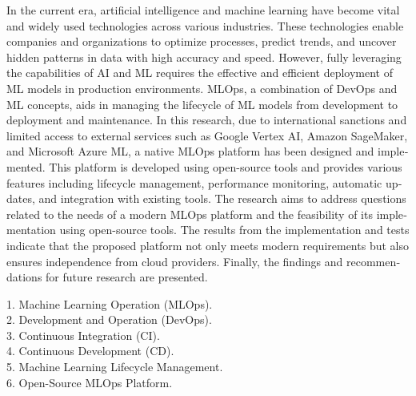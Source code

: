 \thispagestyle{empty}


\phantom{a}
\vfil

\begin{latin}
\centering
\begin{minipage}{0.9\textwidth}
{


\vskip 2mm

\baselineskip
In the current era, artificial intelligence and machine learning  have become vital and widely used technologies across various industries. These technologies enable companies and organizations to optimize processes, predict trends, and uncover hidden patterns in data with high accuracy and speed. However, fully leveraging the capabilities of AI and ML requires the effective and efficient deployment of ML models in production environments. MLOps, a combination of DevOps and ML concepts, aids in managing the lifecycle of ML models from development to deployment and maintenance. In this research, due to international sanctions and limited access to external services such as Google Vertex AI, Amazon SageMaker, and Microsoft Azure ML, a native MLOps platform has been designed and implemented. This platform is developed using open-source tools and provides various features including lifecycle management, performance monitoring, automatic updates, and integration with existing tools. The research aims to address questions related to the needs of a modern MLOps platform and the feasibility of its implementation using open-source tools. The results from the implementation and tests indicate that the proposed platform not only meets modern requirements but also ensures independence from cloud providers. Finally, the findings and recommendations for future research are presented.  \\
\baselineskip

\vspace{15mm}

\vskip 2mm

{
1. Machine Learning Operation (MLOps). \\
2. Development and Operation (DevOps). \\
3. Continuous Integration (CI). \\
4. Continuous Development (CD). \\
5. Machine Learning Lifecycle Management. \\
6. Open-Source MLOps Platform. \\

}
}
\end{minipage}
\end{latin}
\vfil
  
